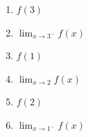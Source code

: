 \documentclass[12pt]{article}
\begin{document}
\begin{enumerate}
\begin{multicols}{3}
\begin{enumerate}
	\item $f(3)$
	\vspace{2pc}
	
	\item $\lim_{x\to 3^-}f(x)$
	\vspace{2pc}
	
	\item $f(1)$
	\vspace{2pc}
	
	\item $\lim_{x\to 2}f(x)$
	\vspace{2pc}
	
	\item $f(2)$
	\vspace{2pc}
	
	\item $\lim_{x\to 1^-}f(x)$	
\end{enumerate}
\end{multicols}

\end{enumerate}
\end{document}
